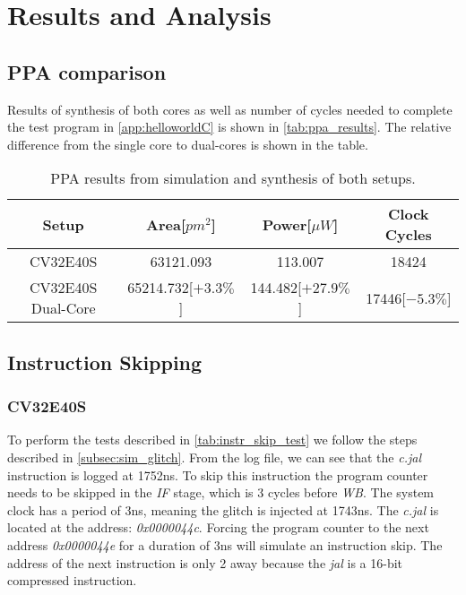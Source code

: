 \chapter{Results and Analysis}
\label{chap5}

\section{PPA comparison}
\label{sec:synth_comparison}

Results of synthesis of both cores as well as number of cycles needed to complete the test program in \autoref{app:helloworldC} is shown in \autoref{tab:ppa_results}. The relative difference from the single core to dual-cores is shown in the table.

\begin{table}[h]
\centering
\caption{PPA results from simulation and synthesis of both setups.}
\label{tab:ppa_results}
\begin{tabular}{c|ccc}
\toprule 
Setup & Area[$pm^2$] & Power[$\mu W$] & Clock Cycles\\
\midrule
\rowcolor{black!20} CV32E40S & 63121.093 & 113.007 & 18424\\
CV32E40S Dual-Core & 65214.732[$+3.3\%$] & 144.482[$+27.9\%$] & 17446[$-5.3\%$] \\
\bottomrule
\end{tabular}
\end{table}

\section{Instruction Skipping}
\label{sec:instr_skip_result}

\subsection{CV32E40S}
\label{subsec:single_instr_skip}

To perform the tests described in \autoref{tab:instr_skip_test} we follow the steps described in \autoref{subsec:sim_glitch}. From the log file, we can see that the \textit{c.jal} instruction is logged at 1752ns. To skip this instruction the program counter needs to be skipped in the \textit{IF} stage, which is 3 cycles before \textit{WB}. The system clock has a period of 3ns, meaning the glitch is injected at 1743ns. The \textit{c.jal} is located at the address: \textit{0x0000044c}. Forcing the program counter to the next address \textit{0x0000044e} for a duration of 3ns will simulate an instruction skip. The address of the next instruction is only 2 away because the \textit{jal} is a 16-bit compressed instruction.

